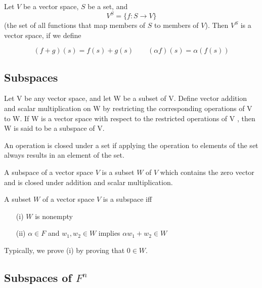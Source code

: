 \begin{theorem}
  Let $V$ be a vector space, $S$ be a set, and
  \[
    V^S = \{ f : S \rightarrow V \}
  \]
  (the set of all functions that map members of $S$ to members of $V$). Then $V^S$ is a vector space, if we define

  \[
    (f + g)(s) = f(s) + g(s) \qquad (\alpha f)(s) = \alpha (f(s))
  \]
\end{theorem}

\subsection{Subspaces}

\begin{definition}[Subspace]
  Let V be any vector space, and let W be a subset of V. Define vector addition and scalar multiplication on W by restricting the corresponding operations of V to W. If W is a vector space with respect to the restricted operations of V , then W is said to be a subspace of V.
\end{definition}

\begin{definition}[Closed]
  An operation is closed under a set if applying the operation to elements of the set always results in an element of the set.
\end{definition}

\begin{definition}[Subspace]
  A subspace of a vector space $V$ is a subset $W$ of $V$ which contains the zero vector and is closed under addition and scalar multiplication.
\end{definition}

\begin{theorem}
  A subset $W$ of a vector space $V$ is a subspace iff
  \begin{itemize}
    \item[(i)] $W$ is nonempty
    \item[(ii)] $\alpha \in F$ and $w_1, w_2 \in W$ implies $\alpha w_1 + w_2 \in W$
  \end{itemize}

  Typically, we prove (i) by proving that $0 \in W$.
\end{theorem}

\subsection{Subspaces of $F^n$}

